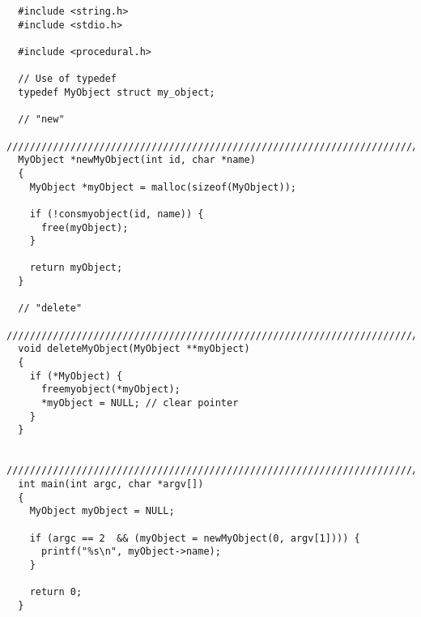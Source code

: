 \documentclass{article}
\begin{document}
\begin{lstlisting}
  #include <string.h>
  #include <stdio.h>

  #include <procedural.h>

  // Use of typedef
  typedef MyObject struct my_object;

  // "new"
  ////////////////////////////////////////////////////////////////////////////////
  MyObject *newMyObject(int id, char *name)
  {
    MyObject *myObject = malloc(sizeof(MyObject));
    
    if (!consmyobject(id, name)) {
      free(myObject);
    }

    return myObject;
  }

  // "delete"
  ////////////////////////////////////////////////////////////////////////////////
  void deleteMyObject(MyObject **myObject)
  {
    if (*MyObject) {
      freemyobject(*myObject);
      *myObject = NULL; // clear pointer
    }
  }

  ////////////////////////////////////////////////////////////////////////////////
  int main(int argc, char *argv[])
  {
    MyObject myObject = NULL;

    if (argc == 2  && (myObject = newMyObject(0, argv[1]))) {
      printf("%s\n", myObject->name);
    }

    return 0;
  }

\end{lstlisting}
\end{document}
